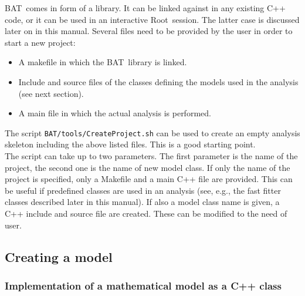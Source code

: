 \documentclass[11pt, a4paper]{article}
\newcommand{\bat}{{\sc BAT}}
\newcommand{\Root}{{\sc Root}}
\begin{document}
\bat\ comes in form of a library. It can be linked against in any
existing C++ code, or it can be used in an interactive
\Root\ session. The latter case is discussed later on in this
manual. Several files need to be provided by the user in order to
start a new project:
%
\begin{itemize}
\item A makefile in which the \bat\ library is linked.
\item Include and source files of the classes defining the models
used in the analysis (see next section).
\item A main file in which the actual analysis is performed.
\end{itemize}
%
The script \verb|BAT/tools/CreateProject.sh| can be used to create an
empty analysis skeleton including the above listed files. This is a
good starting point. \\

\noindent
The script can take up to two parameters. The first parameter is the
name of the project, the second one is the name of new model class. If
only the name of the project is specified, only a Makefile and a main
C++ file are provided. This can be useful if predefined classes are
used in an analysis (see, e.g., the fast fitter classes described
later in this manual). If also a model class name is given, a C++
include and source file are created. These can be modified to the need
of user.


\subsection{Creating a model}
\label{subsection:model}


\subsubsection{Implementation of a mathematical model as a C++ class}
\label{subsubsection:implementation}
\end{document}
